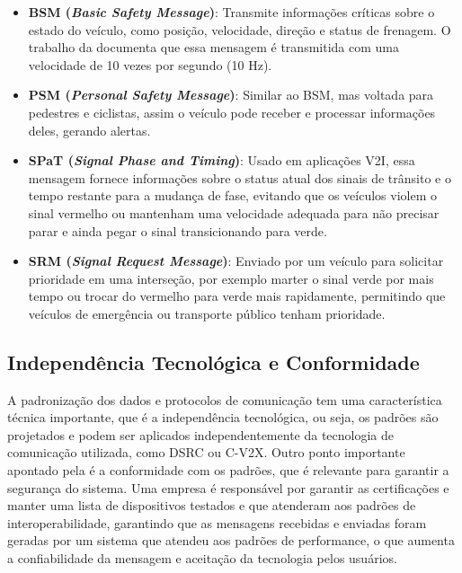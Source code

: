 \begin{itemize}
    \item \textbf{BSM (\textit{Basic Safety Message})}: Transmite informações críticas sobre o estado do veículo, como posição,
    velocidade, direção e status de frenagem. O trabalho da \cite{ref:usdot2024} documenta que essa mensagem é transmitida com
    uma velocidade de 10 vezes por segundo (10 Hz).
    \item \textbf{PSM (\textit{Personal Safety Message})}: Similar ao BSM, mas voltada para pedestres e ciclistas, assim o
    veículo pode receber e processar informações deles, gerando alertas.
    \item \textbf{SPaT (\textit{Signal Phase and Timing})}: Usado em aplicações V2I, essa mensagem fornece informações sobre
    o status atual dos sinais de trânsito e o tempo restante para a mudança de fase, evitando que os veículos violem o sinal
    vermelho ou mantenham uma velocidade adequada para não precisar parar e ainda pegar o sinal transicionando para verde.
    \item \textbf{SRM (\textit{Signal Request Message})}: Enviado por um veículo para solicitar prioridade em uma interseção,
    por exemplo marter o sinal verde por mais tempo ou trocar do vermelho para verde mais rapidamente, permitindo que veículos
    de emergência ou transporte público tenham prioridade.
\end{itemize}

\subsection{Independência Tecnológica e Conformidade}

A padronização dos dados e protocolos de comunicação tem uma característica técnica importante, que é a independência
tecnológica, ou seja, os padrões são projetados e podem ser aplicados independentemente da tecnologia de comunicação utilizada,
como DSRC ou C-V2X.
Outro ponto importante apontado pela \cite{ref:usdot2024} é a conformidade com os padrões, que é relevante para garantir a
segurança do sistema. Uma empresa é responsável por garantir as certificações e manter uma lista de dispositivos testados e
que atenderam aos padrões de interoperabilidade, garantindo que as mensagens recebidas e enviadas foram geradas por um sistema
que atendeu aos padrões de performance, o que aumenta a confiabilidade da mensagem e aceitação da tecnologia pelos usuários.
